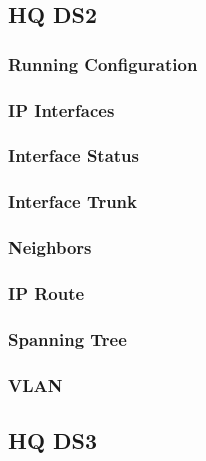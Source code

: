 \subsection{HQ DS2}
\subsubsection{Running Configuration}


\subsubsection{IP Interfaces}


\subsubsection{Interface Status}


\subsubsection{Interface Trunk}


\subsubsection{Neighbors}


\subsubsection{IP Route}


\subsubsection{Spanning Tree}


\subsubsection{VLAN}






\subsection{HQ DS3}
